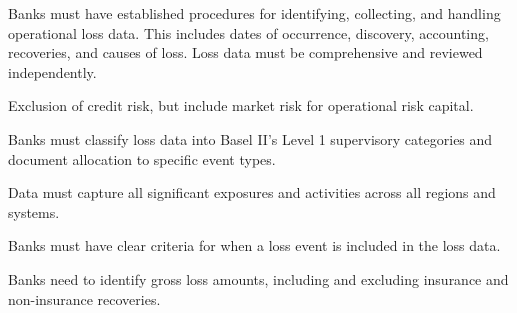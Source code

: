 


\begin{lettered}
\item Banks must have established procedures for identifying, collecting, and
handling operational loss data. This includes dates of occurrence, discovery,
accounting, recoveries, and causes of loss. Loss data must be comprehensive and
reviewed independently.
\item Exclusion of credit risk, but include market risk for operational risk
capital.
\item Banks must classify loss data into Basel II's Level 1 supervisory categories
and document allocation to specific event types.
\item Data must capture all significant exposures and activities across all regions
and systems.
\end{lettered}


\begin{lettered}
\item Banks must have clear criteria for when a loss event is included in the loss
data.
\item Banks need to identify gross loss amounts, including and excluding insurance
and non-insurance recoveries.
\end{lettered}
